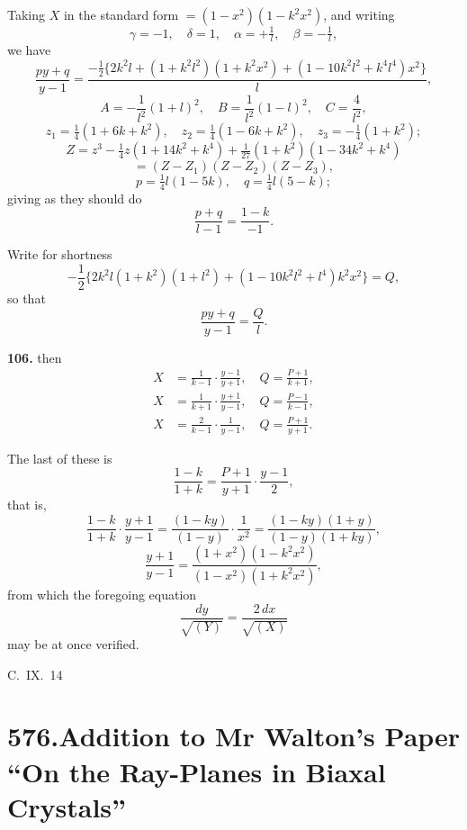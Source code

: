 \documentclass[11pt,a4paper]{article}
\theoremstyle{plain}
\begin{document}
Taking $X$ in the standard form $= (1 - x^2)(1 - k^2x^2)$, and writing
\[
\gamma = -1, \quad \delta = 1, \quad \alpha = +\tfrac{1}{l}, \quad \beta = -\tfrac{1}{l},
\]
we have
\[
\frac{py + q}{y - 1} = \frac{-\frac{1}{2}\{2k^2l + (1 + k^2l^2)(1 + k^2x^2) + (1 - 10k^2l^2 + k^4l^4)x^2\}}{l},
\]
\[
A = -\frac{1}{l^2}(1 + l)^2, \quad B = \frac{1}{l^2}(1 - l)^2, \quad C = \frac{4}{l^2},
\]
\[
z_1 = \tfrac{1}{4}(1 + 6k + k^2), \quad z_2 = \tfrac{1}{4}(1 - 6k + k^2), \quad z_3 = -\tfrac{1}{4}(1 + k^2);
\]
\[
Z = z^3 - \tfrac{1}{4}z(1 + 14k^2 + k^4) + \tfrac{1}{27}(1 + k^2)(1 - 34k^2 + k^4)
\]
\[
= (Z - Z_1)(Z - Z_2)(Z - Z_3),
\]
\[
p = \tfrac{1}{4}l(1 - 5k), \quad q = \tfrac{1}{4}l(5 - k);
\]
giving as they should do
\[
\frac{p + q}{l - 1} = \frac{1 - k}{-1}.
\]

Write for shortness
\[
-\frac{1}{2}\{2k^2l(1 + k^2)(1 + l^2) + (1 - 10k^2l^2 + l^4)k^2x^2\} = Q,
\]
so that
\[
\frac{py + q}{y - 1} = \frac{Q}{l}.
\]

\noindent\textbf{106.} then
\begin{align*}
X &= \frac{1}{k - 1}\cdot\frac{y - 1}{y + 1}, \quad Q = \frac{P + 1}{k + 1}, \\
X &= \frac{1}{k + 1}\cdot\frac{y + 1}{y - 1}, \quad Q = \frac{P - 1}{k - 1}, \\
X &= \frac{2}{k - 1}\cdot\frac{1}{y - 1}, \quad Q = \frac{P + 1}{y + 1}.
\end{align*}

The last of these is
\[
\frac{1 - k}{1 + k} = \frac{P + 1}{y + 1}\cdot\frac{y - 1}{2},
\]
that is,
\[
\frac{1 - k}{1 + k}\cdot\frac{y + 1}{y - 1} = \frac{(1 - ky)}{(1 - y)}\cdot\frac{1}{x^2} = \frac{(1 - ky)(1 + y)}{(1 - y)(1 + ky)},
\]
\[
\frac{y + 1}{y - 1} = \frac{(1 + x^2)(1 - k^2x^2)}{(1 - x^2)(1 + k^2x^2)},
\]
from which the foregoing equation
\[
\frac{dy}{\sqrt{(Y)}} = \frac{2\,dx}{\sqrt{(X)}}
\]
may be at once verified.

\medskip
\begin{flushright}
C.~IX.~14
\end{flushright}


\newpage
\section*{576.\quad Addition to Mr Walton's Paper ``On the Ray-Planes in Biaxal Crystals''}
\end{document}
